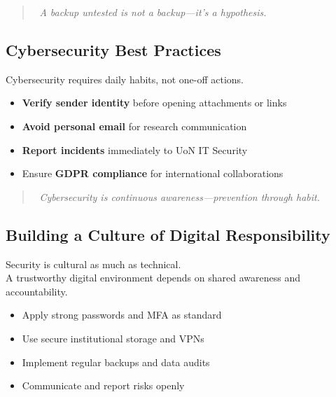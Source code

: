 \documentclass[
  letterpaper,
  DIV=11,
  numbers=noendperiod]{scrartcl}
\providecommand{\tightlist}{%
  \setlength{\itemsep}{0pt}\setlength{\parskip}{0pt}}
\begin{document}
\begin{quote}
💾 \emph{A backup untested is not a backup---it's a hypothesis.}
\end{quote}

\subsection{Cybersecurity Best
Practices}\label{cybersecurity-best-practices}

Cybersecurity requires daily habits, not one-off actions.

\begin{itemize}
\tightlist
\item
  \textbf{Verify sender identity} before opening attachments or links\\
\item
  \textbf{Avoid personal email} for research communication\\
\item
  \textbf{Report incidents} immediately to UoN IT Security\\
\item
  Ensure \textbf{GDPR compliance} for international collaborations
\end{itemize}

\begin{quote}
🧩 \emph{Cybersecurity is continuous awareness---prevention through
habit.}
\end{quote}

\subsection{Building a Culture of Digital
Responsibility}\label{building-a-culture-of-digital-responsibility}

Security is cultural as much as technical.\\
A trustworthy digital environment depends on shared awareness and
accountability.

\begin{itemize}
\tightlist
\item
  Apply strong passwords and MFA as standard\\
\item
  Use secure institutional storage and VPNs\\
\item
  Implement regular backups and data audits\\
\item
  Communicate and report risks openly
\end{itemize}
\end{document}
